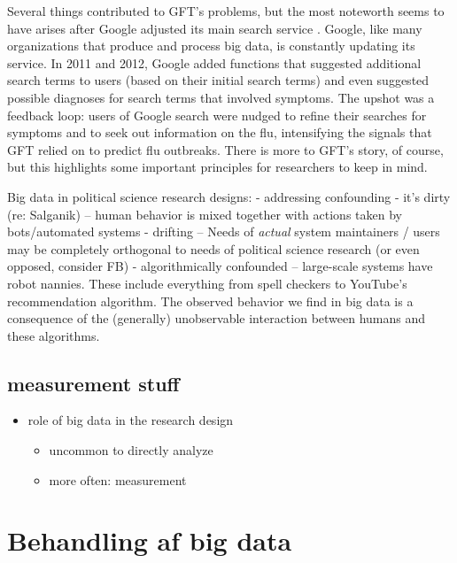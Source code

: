 \documentclass[12pt,]{article}
\providecommand{\tightlist}{%
  \setlength{\itemsep}{0pt}\setlength{\parskip}{0pt}}
\begin{document}
Several things contributed to GFT's problems, but the most noteworth
seems to have arises after Google adjusted its main search service
\citep[see][]{LKKV14}. Google, like many organizations that produce and
process big data, is constantly updating its service. In 2011 and 2012,
Google added functions that suggested additional search terms to users
(based on their initial search terms) and even suggested possible
diagnoses for search terms that involved symptoms. The upshot was a
feedback loop: users of Google search were nudged to refine their
searches for symptoms and to seek out information on the flu,
intensifying the signals that GFT relied on to predict flu outbreaks.
There is more to GFT's story, of course, but this highlights some
important principles for researchers to keep in mind.

Big data in political science research designs: - addressing confounding
- it's dirty (re: Salganik) -- human behavior is mixed together with
actions taken by bots/automated systems - drifting -- Needs of
\emph{actual} system maintainers / users may be completely orthogonal to
needs of political science research (or even opposed, consider FB) -
algorithmically confounded -- large-scale systems have robot nannies.
These include everything from spell checkers to YouTube's recommendation
algorithm. The observed behavior we find in big data is a consequence of
the (generally) unobservable interaction between humans and these
algorithms.

\hypertarget{measurement-stuff}{%
\subsection{measurement stuff}\label{measurement-stuff}}

\begin{itemize}
\tightlist
\item
  role of big data in the research design

  \begin{itemize}
  \tightlist
  \item
    uncommon to directly analyze
  \item
    more often: measurement
  \end{itemize}
\end{itemize}

\hypertarget{behandling-af-big-data}{%
\section{Behandling af big data}\label{behandling-af-big-data}}
\end{document}
